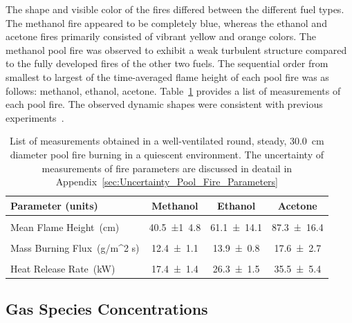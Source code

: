 \documentclass[12pt]{article}
\begin{document}
The shape and visible color of the fires differed between the different fuel types. The methanol fire appeared to be completely blue, whereas the ethanol and acetone fires primarily consisted of vibrant yellow and orange colors. The methanol pool fire was observed to exhibit a weak turbulent structure compared to the fully developed fires of the other two fuels.  The sequential order from smallest to largest of the time-averaged flame height of each pool fire was as follows: methanol, ethanol, acetone. Table~\ref{tab:Pool_Fire_Parameters_Table} provides a list of measurements of each pool fire. The observed dynamic shapes were consistent with previous experiments~\cite{Hamins2016,Hamins1994,Hamins1991,Hamins1996,Lock2008}.

\begin{table}[!]
\caption{List of measurements obtained in a well-ventilated round, steady, 30.0~\si{cm} diameter pool fire burning in a quiescent environment. The uncertainty of measurements of fire parameters are discussed in deatail in Appendix~\ref{sec:Uncertainty_Pool_Fire_Parameters}}
\label{tab:Pool_Fire_Parameters_Table}
\centering
	\footnotesize
	\begin{tabular}{lccc}
\hline
\textbf{Parameter (units)} &\textbf{Methanol}& \textbf{Ethanol}& \textbf{Acetone}\\
\hline
\\[0.01cm]
Mean Flame Height~(\si{cm})	&	40.5~±1~4.8		&	61.1~±~14.1	&	87.3~±~16.4\\	
\\[0.01cm]
Mass Burning Flux~(\si{g/{m^2 s}})		&	12.4~±~1.1			&	13.9~±~0.8		&	17.6~±~2.7\\
\\[0.01cm]
Heat Release Rate~(\si{kW})	&	17.4~±~1.4			&	26.3~±~1.5		&	35.5~±~5.4\\
\hline
\end{tabular}
\end{table}

\subsection{Gas Species Concentrations}
\label{ssec:Gas_Species_Concentrations}
\end{document}

